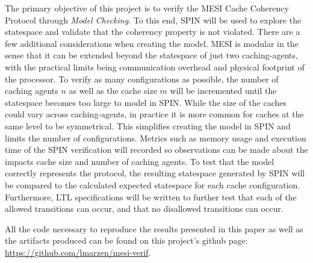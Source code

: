 \documentclass[12pt]{article}
\begin{document}
The primary objective of this project is to verify the MESI Cache Coherency Protocol through \textit{Model Checking}. To this end, SPIN will be used to explore the statespace and validate that the coherency property is not violated. There are a few additional considerations when creating the model. MESI is modular in the sense that it can be extended beyond the statespace of just two caching-agents, with the practical limits being communication overhead and physical footprint of the processor. To verify as many configurations as possible, the number of caching agents $n$ as well as the cache size $m$ will be incremented until the statespace becomes too large to model in SPIN. While the size of the caches could vary across caching-agents, in practice it is more common for caches at the same level to be symmetrical. This simplifies creating the model in SPIN and limits the number of configurations. Metrics such as memory usage and execution time of the SPIN verification will recorded so observations can be made about the impacts cache size and number of caching agents. To test that the model correctly represents the protocol, the resulting statespace generated by SPIN will be compared to the calculated expected statespace for each cache configuration. Furthermore, LTL specifications will be written to further test that each of the allowed transitions can occur, and that no disallowed transitions can occur.

All the code necessary to reproduce the results presented in this paper as well as the artifacts produced can be found on this project's github page: \href{https://github.com/lmarzen/mesi-verif}{https://github.com/lmarzen/mesi-verif}.

\clearpage{
\printbibliography
}
\end{document}
